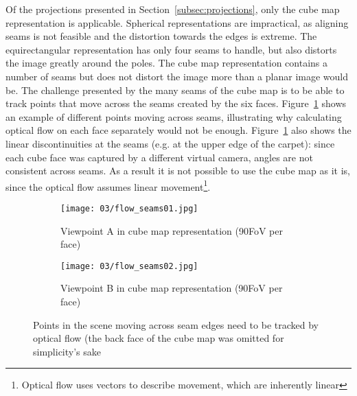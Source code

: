 
Of the projections presented in Section~\ref{subsec:projections}, only the cube map representation is applicable. Spherical representations are impractical, as aligning seams is not feasible and the distortion towards the edges is extreme. The equirectangular representation has only four seams to handle, but also distorts the image greatly around the poles. The cube map representation contains a number of seams but does not distort the image more than a planar image would be. 
The challenge presented by the many seams of the cube map is to be able to track points that move across the seams created by the six faces. Figure~\ref{fig:flow_seams} shows an example of different points moving across seams, illustrating why calculating optical flow on each face separately would not be enough. Figure~\ref{fig:flow_seams} also shows the linear discontinuities at the seams (e.g. at the upper edge of the carpet): since each cube face was captured by a different virtual camera, angles are not consistent across seams. As a result it is not possible to use the cube map as it is, since the optical flow assumes linear movement\footnote{Optical flow uses vectors to describe movement, which are inherently linear}.

\begin{figure}
\centering
    \hfill
    \begin{subfigure}[t]{0.5\textwidth}            
            \centering
            \texttt{[image: 03/flow\_seams01.jpg]}
            \caption{Viewpoint A in cube map representation (90\degree FoV per face)}
    \end{subfigure}%
    \hfill
    \begin{subfigure}[t]{0.5\textwidth}
            \centering
            \texttt{[image: 03/flow\_seams02.jpg]}
            \caption{Viewpoint B in cube map representation (90\degree FoV per face)}
    \end{subfigure}
    \hfill
    \hfill
  \caption[Points traversing seams in the cube map]{Points in the scene moving across seam edges need to be tracked by optical flow (the back face of the cube map was omitted for simplicity's sake} \label{fig:flow_seams}
\end{figure}

